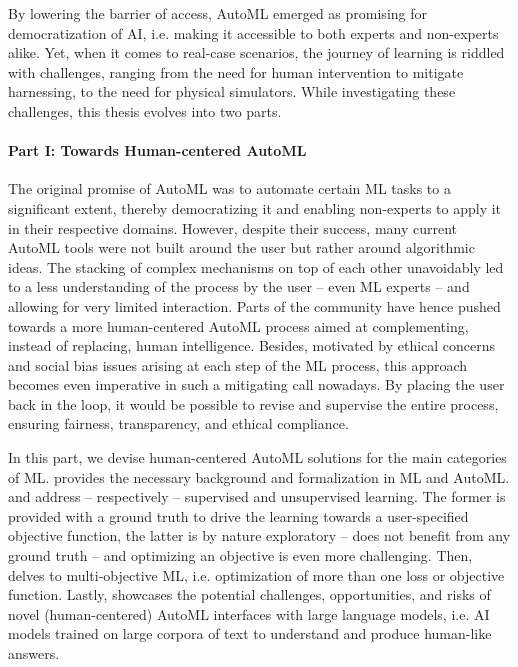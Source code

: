 \documentclass[a4paper,12pt,times,numbered,print,index]{Classes/PhDThesisPSnPDF}
\begin{document}
By lowering the barrier of access, AutoML emerged as promising for democratization of AI, i.e. making it accessible to both experts and non-experts alike.
Yet, when it comes to real-case scenarios, the journey of learning is riddled with challenges, ranging from the need for human intervention to mitigate harnessing, to the need for physical simulators. 
While investigating these challenges, this thesis evolves into two parts.




\paragraph{Part I: Towards Human-centered AutoML}

The original promise of AutoML was to automate certain ML tasks to a significant extent, thereby democratizing it and enabling non-experts to apply it in their respective domains.
However, despite their success, many current AutoML tools were not built around the user but rather around algorithmic ideas.
The stacking of complex mechanisms on top of each other unavoidably led to a less understanding of the process by the user -- even ML experts -- and allowing for very limited interaction.
Parts of the community have hence pushed towards a more human-centered AutoML process aimed at complementing, instead of replacing, human intelligence. 
Besides, motivated by ethical concerns and social bias issues arising at each step of the ML process, this approach becomes even imperative in such a mitigating call nowadays.
By placing the user back in the loop, it would be possible to revise and supervise the entire process, ensuring fairness, transparency, and ethical compliance. 

In this part, we devise human-centered AutoML solutions for the main categories of ML. 
 provides the necessary background and formalization in ML and AutoML.
 and  address -- respectively -- supervised and unsupervised learning. 
The former is provided with a ground truth to drive the learning towards a user-specified objective function, the latter is by nature exploratory -- does not benefit from any ground truth -- and optimizing an objective is even more challenging.
Then,  delves to multi-objective ML, i.e. optimization of more than one loss or objective function.
Lastly,  showcases the potential challenges, opportunities, and risks of novel (human-centered) AutoML interfaces with large language models, i.e. AI models trained on large corpora of text to understand and produce human-like answers.
\end{document}
